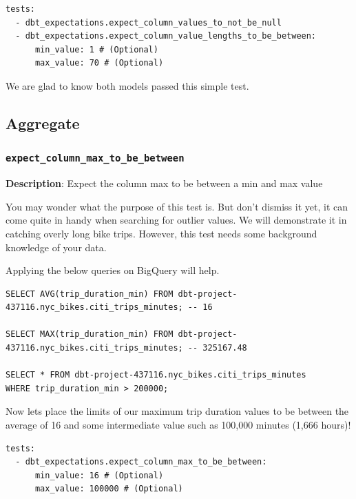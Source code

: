 \documentclass[
]{book}
\begin{document}
\begin{verbatim}
tests:
  - dbt_expectations.expect_column_values_to_not_be_null
  - dbt_expectations.expect_column_value_lengths_to_be_between:
      min_value: 1 # (Optional)
      max_value: 70 # (Optional)
\end{verbatim}

We are glad to know both models passed this simple test.

\hypertarget{aggregate}{%
\subsection{Aggregate}\label{aggregate}}

\hypertarget{expect_column_max_to_be_between}{%
\subsubsection{\texorpdfstring{\texttt{expect\_column\_max\_to\_be\_between}}{expect\_column\_max\_to\_be\_between}}\label{expect_column_max_to_be_between}}

\textbf{Description}: Expect the column max to be between a min and max value

You may wonder what the purpose of this test is. But don't dismiss it yet, it can come quite in handy when searching for outlier values. We will demonstrate it in catching overly long bike trips. However, this test needs some background knowledge of your data.

Applying the below queries on BigQuery will help.

\begin{verbatim}
SELECT AVG(trip_duration_min) FROM dbt-project-437116.nyc_bikes.citi_trips_minutes; -- 16

SELECT MAX(trip_duration_min) FROM dbt-project-437116.nyc_bikes.citi_trips_minutes; -- 325167.48

SELECT * FROM dbt-project-437116.nyc_bikes.citi_trips_minutes
WHERE trip_duration_min > 200000;
\end{verbatim}

Now lets place the limits of our maximum trip duration values to be between the average of 16 and some intermediate value such as 100,000 minutes (1,666 hours)!

\begin{verbatim}
tests:
  - dbt_expectations.expect_column_max_to_be_between:
      min_value: 16 # (Optional)
      max_value: 100000 # (Optional)
\end{verbatim}
\end{document}
